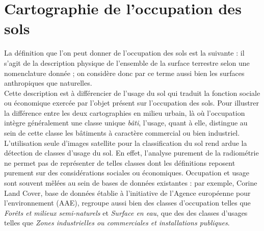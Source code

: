 \section{Cartographie de l'occupation des sols}
\label{sec:ocs}
La définition que l'on peut donner de l'occupation des sols est la suivante : il s'agit de la description physique de l'ensemble de la surface terrestre selon une nomenclature donnée ; on considère donc par ce terme aussi bien les surfaces anthropiques que naturelles.\\
Cette description est à différencier de l'usage du sol qui traduit la fonction sociale ou économique exercée par l'objet présent sur l'occupation des sols. Pour illustrer la différence entre les deux cartographies en milieu urbain, là où l'occupation intègre généralement une classe unique \textit{bâti}, l'usage, quant à elle, distingue au sein de cette classe les bâtiments à caractère commercial ou bien industriel. L'utilisation seule d'images satellite pour la classification du sol rend ardue la détection de classes d'usage du sol. En effet, l'analyse purement de la radiométrie ne permet pas de représenter de telles classes dont les définitions reposent purement sur des considérations sociales ou économiques. Occupation et usage sont souvent mêlées au sein de bases de données existantes : par exemple, Corine Land Cover, base de données établie à l'initiative de l'Agence européenne pour l'environnement (AAE), regroupe aussi bien des classes d'occupation telles que \textit{Forêts et milieux semi-naturels} et \textit{Surface en eau}, que des des classes d'usages telles que \textit{Zones industrielles ou commerciales et installations publiques}.\\
